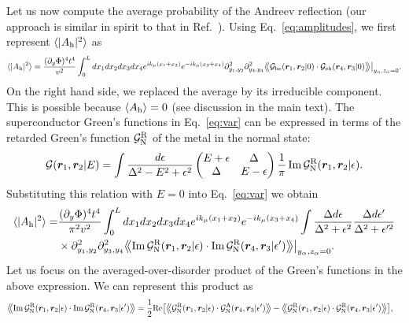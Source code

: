 \documentclass[pra,aps,a4paper,twocolumn,superscriptaddress,longbibliography]{revtex4-2}
\newcommand{\Rngl}{\big\rangle\hspace{-0.085cm}\big\rangle}
\newcommand{\Lngl}{\big\langle\hspace{-0.085cm}\big\langle}
\newcommand{\lprox}{L}
\newcommand{\he}{A_{\rm h}}
\newcommand{\GR}{{\cal G}^{\rm R}_{\rm N}}
\newcommand{\GA}{{\cal G}^{\rm A}_{\rm N}}
\begin{document}
Let us now compute the average probability of the Andreev reflection (our approach is similar in spirit to that in Ref.~).
Using Eq.~\eqref{eq:amplitudes}, we first represent $\langle |\he|^2 \rangle$ as
\begin{align}\label{eq:var}
    \langle |\he |^2 \rangle = \frac{(\partial_y \Phi)^4 t^4}{v^2}\int^{\lprox}_{0} dx_{1}dx_{2}dx_{3}dx_{4}e^{ik_\mu(x_1 +x_2)}e^{-ik_\mu(x_3 + x_4)}\partial^2_{y_1,y_2}\partial^2_{y_3, y_4}\Lngl {\cal G}_{\rm he}(\bm r_1, \bm r_2|0)\cdot {\cal G}_{\rm eh}(\bm r_4, \bm r_3|0)\Rngl\big|_{y_\alpha, z_\alpha = 0}.
\end{align}
On the right hand side, we replaced the average by its irreducible component. This is possible because $\langle \he \rangle = 0$ (see discussion in the main text). 
The superconductor Green's functions in Eq.~\eqref{eq:var} can be expressed in terms of the retarded Green's function $\GR$ of the metal in the normal state:
\begin{equation}\label{eq:greeen}
    {\cal G} ({\bm r}_1, {\bm r}_2| E) = \int \frac{d\epsilon}{\Delta^2 - E^2 + \epsilon^2} \begin{pmatrix}
    E+\epsilon & \Delta\\
    \Delta & E - \epsilon
    \end{pmatrix} \frac{1}{\pi}\,{\rm Im}\,\GR ({\bm r}_1, {\bm r}_2| \epsilon).
\end{equation}
Substituting this relation with $E = 0$ into Eq.~\eqref{eq:var} we obtain
\begin{align}\label{eq:var2}
   \langle |\he|^2 \rangle  =&  \frac{(\partial_y \Phi)^4 t^4}{\pi^2 v^2}\int^{\lprox}_{0} dx_{1}dx_{2}dx_{3}dx_{4}e^{ik_\mu(x_1 +x_2)}e^{-ik_\mu(x_3 + x_4)}\int \frac{\Delta d\epsilon}{\Delta^2 +\epsilon^2} \frac{\Delta d\epsilon^\prime}{\Delta^2+\epsilon^{\prime 2}}\notag\\
    &\times\partial^2_{y_1,y_2}\partial^2_{y_3, y_4}\Lngl {\rm Im}\, \GR(\bm r_1, \bm r_2|\epsilon)\cdot{\rm Im}\, \GR(\bm r_4, \bm r_3|\epsilon^\prime)\Rngl\big|_{y_\alpha, z_\alpha = 0}.
\end{align}
Let us focus on the averaged-over-disorder product of the Green's functions in the above expression. We can represent this product as
\begin{align}\label{eq:two_conts}
    \Lngl {\rm Im}\, \GR({\bm r}_1,{\bm r}_2|\epsilon)&\cdot {\rm Im}\, \GR({\bm r}_4, {\bm r}_3|\epsilon^\prime)\Rngl = \frac{1}{2}{\rm Re}\big[\Lngl \GR({\bm r}_1,{\bm r}_2|\epsilon)\cdot \GA({\bm r}_4, {\bm r}_3|\epsilon^\prime)\Rngl - \Lngl \GR({\bm r}_1,{\bm r}_2|\epsilon)\cdot \GR({\bm r}_4, {\bm r}_3|\epsilon^\prime)\Rngl\big],
\end{align}
\end{document}
